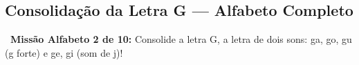 
\subsection*{Consolida\c{c}\~a{}o da Letra G --- Alfabeto Completo}


\begin{missao}
\textbf{\faGamepad~Miss\~a{}o Alfabeto 2 de 10:} Consolide a letra G, a letra de dois sons: ga, go, gu (g forte) e ge, gi (som de j)!
\end{missao}




